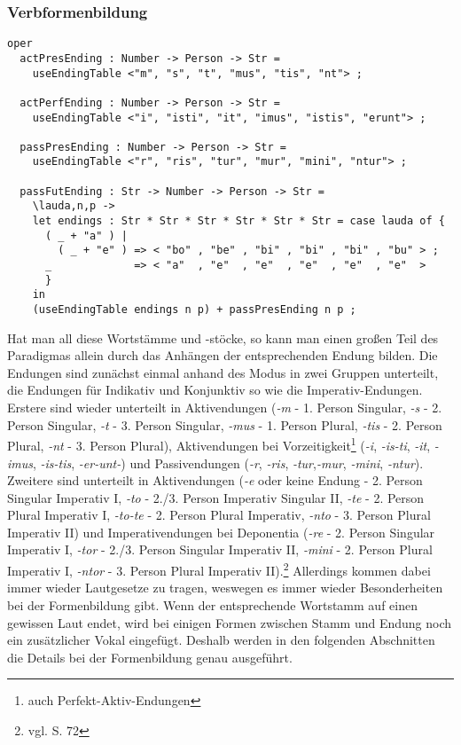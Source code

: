 \subsubsection{Verbformenbildung}
\begin{lstlisting}[float=h!tp,caption={Funktionen um Verbendungen zu bilden und bereitzustellen (vgl. \textbf{ResLat.gf})},label={GF-Morpho-Deponent3c},basicstyle=\small]
oper
  actPresEnding : Number -> Person -> Str = 
    useEndingTable <"m", "s", "t", "mus", "tis", "nt"> ;

  actPerfEnding : Number -> Person -> Str = 
    useEndingTable <"i", "isti", "it", "imus", "istis", "erunt"> ;

  passPresEnding : Number -> Person -> Str =
    useEndingTable <"r", "ris", "tur", "mur", "mini", "ntur"> ;

  passFutEnding : Str -> Number -> Person -> Str = 
    \lauda,n,p ->
    let endings : Str * Str * Str * Str * Str * Str = case lauda of {
	  ( _ + "a" ) | 
	    ( _ + "e" ) => < "bo" , "be" , "bi" , "bi" , "bi" , "bu" > ;
	  _             => < "a"  , "e"  , "e"  , "e"  , "e"  , "e"  >
	  }
    in
    (useEndingTable endings n p) + passPresEnding n p ;
\end{lstlisting}
Hat man all diese Wortstämme und -stöcke, so kann man einen großen Teil des Paradigmas allein durch das Anhängen der entsprechenden Endung bilden. Die Endungen sind zunächst einmal anhand des Modus in zwei Gruppen unterteilt, die Endungen für Indikativ und Konjunktiv so wie die Imperativ-Endungen. Erstere sind wieder unterteilt in Aktivendungen (\textit{-m} - 1. Person Singular, \textit{-s} - 2. Person Singular, \textit{-t} - 3. Person Singular, \textit{-mus} - 1. Person Plural, \textit{-tis} - 2. Person Plural, \textit{-nt} - 3. Person Plural), Aktivendungen bei Vorzeitigkeit\footnote{auch Perfekt-Aktiv-Endungen} (\textit{-i}, \textit{-is-ti}, \textit{-it}, \textit{-imus}, \textit{-is-tis}, \textit{-er-unt-}) und Passivendungen (\textit{-r}, \textit{-ris}, \textit{-tur},\textit{-mur}, \textit{-mini}, \textit{-ntur}). Zweitere sind unterteilt in Aktivendungen (\textit{-e} oder keine Endung - 2. Person Singular Imperativ I, \textit{-to} - 2./3. Person Imperativ Singular II, \textit{-te} - 2. Person Plural Imperativ I, \textit{-to-te} - 2. Person Plural Imperativ, \textit{-nto} - 3. Person Plural Imperativ II) und Imperativendungen bei Deponentia (\textit{-re} - 2. Person Singular Imperativ I, \textit{-tor} - 2./3. Person Singular Imperativ II, \textit{-mini} - 2. Person Plural Imperativ I, \textit{-ntor} - 3. Person Plural Imperativ II).\footnote{vgl. \cite{BAYER-LINDAUER1994} S. 72} Allerdings kommen dabei immer wieder Lautgesetze zu tragen, weswegen es immer wieder Besonderheiten bei der Formenbildung gibt. Wenn der entsprechende Wortstamm auf einen gewissen Laut endet, wird bei einigen Formen zwischen Stamm und Endung noch ein zusätzlicher Vokal eingefügt. Deshalb werden in den folgenden Abschnitten die Details bei der Formenbildung genau ausgeführt.\par
\FloatBarrier
